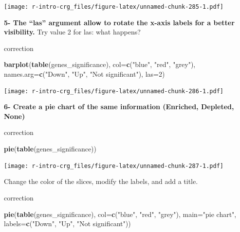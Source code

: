 \documentclass[]{book}
\newenvironment{Shaded}{\begin{snugshade}}{\end{snugshade}}
\newcommand{\DataTypeTok}[1]{\textcolor[rgb]{0.13,0.29,0.53}{#1}}
\newcommand{\DecValTok}[1]{\textcolor[rgb]{0.00,0.00,0.81}{#1}}
\newcommand{\KeywordTok}[1]{\textcolor[rgb]{0.13,0.29,0.53}{\textbf{#1}}}
\newcommand{\NormalTok}[1]{#1}
\newcommand{\StringTok}[1]{\textcolor[rgb]{0.31,0.60,0.02}{#1}}
\begin{document}
\texttt{[image: r-intro-crg\_files/figure-latex/unnamed-chunk-285-1.pdf]}

\textbf{5- The ``las'' argument allow to rotate the x-axis labels for a better visibility.}
Try value 2 for las: what happens?

correction

\begin{Shaded}
\begin{Highlighting}[]
\KeywordTok{barplot}\NormalTok{(}\KeywordTok{table}\NormalTok{(genes_significance), }
  \DataTypeTok{col=}\KeywordTok{c}\NormalTok{(}\StringTok{"blue"}\NormalTok{, }\StringTok{"red"}\NormalTok{, }\StringTok{"grey"}\NormalTok{), }
  \DataTypeTok{names.arg=}\KeywordTok{c}\NormalTok{(}\StringTok{"Down"}\NormalTok{, }\StringTok{"Up"}\NormalTok{, }\StringTok{"Not significant"}\NormalTok{), }
  \DataTypeTok{las=}\DecValTok{2}\NormalTok{)}
\end{Highlighting}
\end{Shaded}

\texttt{[image: r-intro-crg\_files/figure-latex/unnamed-chunk-286-1.pdf]}

\textbf{6- Create a pie chart of the same information (Enriched, Depleted, None)}

correction

\begin{Shaded}
\begin{Highlighting}[]
\KeywordTok{pie}\NormalTok{(}\KeywordTok{table}\NormalTok{(genes_significance))}
\end{Highlighting}
\end{Shaded}

\texttt{[image: r-intro-crg\_files/figure-latex/unnamed-chunk-287-1.pdf]}

Change the color of the slices, modify the labels, and add a title.

correction

\begin{Shaded}
\begin{Highlighting}[]
\KeywordTok{pie}\NormalTok{(}\KeywordTok{table}\NormalTok{(genes_significance), }
    \DataTypeTok{col=}\KeywordTok{c}\NormalTok{(}\StringTok{"blue"}\NormalTok{, }\StringTok{"red"}\NormalTok{, }\StringTok{"grey"}\NormalTok{), }
    \DataTypeTok{main=}\StringTok{"pie chart"}\NormalTok{, }
    \DataTypeTok{labels=}\KeywordTok{c}\NormalTok{(}\StringTok{"Down"}\NormalTok{, }\StringTok{"Up"}\NormalTok{, }\StringTok{"Not significant"}\NormalTok{))}
\end{Highlighting}
\end{Shaded}
\end{document}
